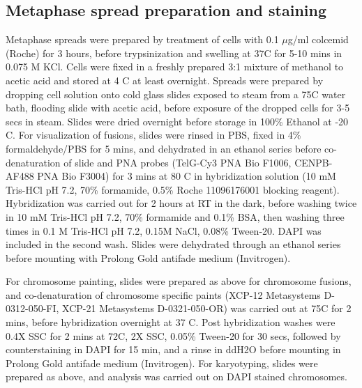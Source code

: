 \documentclass[phd,tocprelim]{cornell}
\begin{document}
\subsection*{Metaphase spread preparation and staining}
Metaphase spreads were prepared by treatment of cells with 0.1 $\mu$g/ml colcemid (Roche) for 3 hours, before trypsinization and swelling at 37\textdegree C for 5-10 mins in 0.075 M KCl. Cells were fixed in a freshly prepared 3:1 mixture of methanol to acetic acid and stored at 4 \textdegree C at least overnight. Spreads were prepared by dropping cell solution onto cold glass slides exposed to steam from a 75\textdegree C water bath, flooding slide with acetic acid, before exposure of the dropped cells for 3-5 secs in steam. Slides were dried overnight before storage in 100\% Ethanol at -20 \textdegree C. For visualization of fusions, slides were rinsed in PBS, fixed in 4\% formaldehyde/PBS for 5 mins, and dehydrated in an ethanol series before co-denaturation of slide and PNA probes (TelG-Cy3 PNA Bio F1006, CENPB-AF488 PNA Bio F3004) for 3 mins at 80 \textdegree C in hybridization solution (10 mM Tris-HCl pH 7.2, 70\% formamide, 0.5\% Roche 11096176001 blocking reagent). Hybridization was carried out for 2 hours at RT in the dark, before washing twice in 10 mM Tris-HCl pH 7.2, 70\% formamide and 0.1\% BSA, then washing three times in 0.1 M Tris-HCl pH 7.2, 0.15M NaCl, 0.08\% Tween-20. DAPI was included in the second wash. Slides were dehydrated through an ethanol series before mounting with Prolong Gold antifade medium (Invitrogen). 

For chromosome painting, slides were prepared as above for chromosome fusions, and co-denaturation of chromosome specific paints (XCP-12 Metasystems D-0312-050-FI, XCP-21 Metasystems D-0321-050-OR) was carried out at 75\textdegree C for 2 mins, before hybridization overnight at 37 \textdegree C. Post hybridization washes were 0.4X SSC for 2 mins at 72\textdegree C, 2X SSC, 0.05\% Tween-20 for 30 secs, followed by counterstaining in DAPI for 15 min, and a rinse in ddH2O before mounting in Prolong Gold antifade medium (Invitrogen). For karyotyping, slides were prepared as above, and analysis was carried out on DAPI stained chromosomes.
\end{document}
